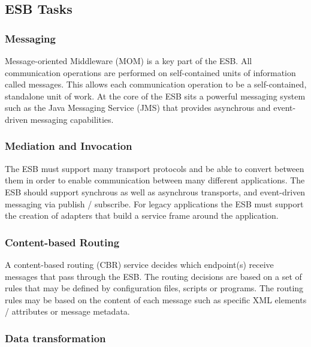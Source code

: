 
\newpage
\subsection{ESB Tasks}
\label{sec:esb-tasks}

\subsubsection{Messaging}
\label{subsec:messaging}
Message-oriented Middleware (MOM) is a key part of the ESB. All
communication operations are performed on self-contained units of information
called messages. This allows each communication operation to be a
self-contained, standalone unit of work.\supercite{chappell} At the core of the
ESB sits a powerful messaging system such as the Java Messaging Service (JMS)
that provides asynchrous and event-driven messaging capabilities.

\subsubsection{Mediation and Invocation}
\label{subsec:mediation-and-invocation}

The ESB must support many transport protocols and be able to convert between them
in order to enable communication between many different applications. The ESB
should support synchrous as well as asynchrous transports, and event-driven
messaging via publish / subscribe. For legacy applications the ESB must support
the creation of adapters that build a service frame around the application.

\subsubsection{Content-based Routing}
\label{subsec:content-based-routing}

A content-based routing (CBR) service decides which endpoint(s) receive messages
that pass through the ESB. The routing decisions are based on a set of rules
that may be defined by configuration files, scripts or programs. The routing
rules may be based on the content of each message such as specific XML
elements / attributes or message metadata.

\subsubsection{Data transformation}
\label{subsec:data-transformation}

